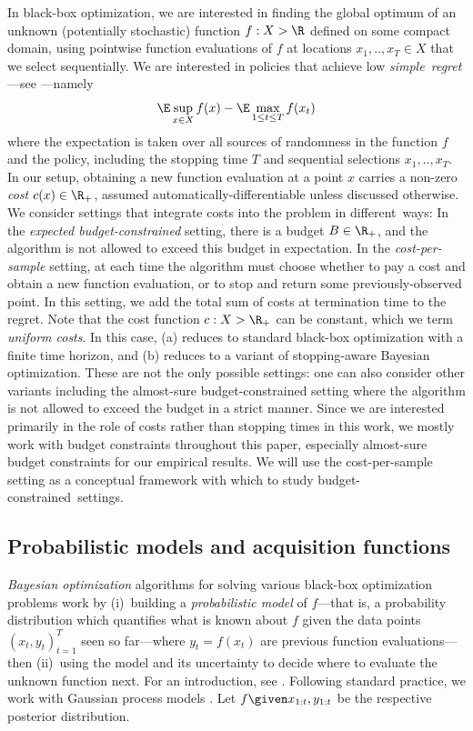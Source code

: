 \documentclass{article}
\begin{document}
In black-box optimization, we are interested in finding the global optimum of an unknown (potentially stochastic) function $f : X \-> \R$ defined on some compact domain, using pointwise function evaluations of $f$ at locations $x_1, .., x_T \in X$ that we select sequentially.
We are interested in policies that achieve low \emph{simple~regret}---see \textcite[Sec. 10.1]{garnett23}---namely
\[
\label{eqn:bb_opt_problem}
\E \sup_{x\in X} f(x) - \E \max_{1\leq t\leq T} f(x_t)
\]
where the expectation is taken over all sources of randomness in the function $f$ and the policy, including the stopping time $T$ and sequential selections $x_1, .., x_T$.
In our setup, obtaining a new function evaluation at a point $x$ carries a non-zero \emph{cost} $c(x) \in \R_+$, assumed automatically-differentiable unless discussed otherwise.
We consider settings that integrate costs into the problem in different~ways: 
\1[(a)] In the \emph{expected budget-constrained} setting, there is a budget $B \in \R_+$, and the algorithm is not allowed to exceed this budget in expectation.
\2 In the \emph{cost-per-sample} setting, at each time the algorithm must choose whether to pay a cost and obtain a new function evaluation, or to stop and return some previously-observed point. In this setting, we add the total sum of costs at termination time to the regret.
\0 
Note that the cost function $c : X \-> \R_+$ can be constant, which we term \emph{uniform costs}. 
In this case, (a) reduces to standard black-box optimization with a finite time horizon, and (b) reduces to a variant of stopping-aware Bayesian optimization.
These are not the only possible settings: one can also consider other variants including the almost-sure budget-constrained setting where the algorithm is not allowed to exceed the budget in a strict manner.
Since we are interested primarily in the role of costs rather than stopping times in this work, we mostly work with budget constraints throughout this paper, especially almost-sure budget constraints for our empirical results.
We will use the cost-per-sample setting as a conceptual framework with which to study budget-constrained~settings.


\subsection{Probabilistic models and acquisition functions}

\emph{Bayesian optimization} algorithms for solving various black-box optimization problems work by (i)~building a \emph{probabilistic model} of $f$---that is, a probability distribution which quantifies what is known about $f$ given the data points $(x_t, y_t)_{t=1}^T$ seen so far---where $y_t = f(x_t)$ are previous function evaluations---then (ii)~using the model and its uncertainty to decide where to evaluate the unknown function next.
For an introduction, see \textcite{frazier18,garnett23}.
Following standard practice, we work with Gaussian process models \cite{rasmussen06}. 
Let $f \given x_{1:t}, y_{1:t}$ be the respective posterior distribution.
\end{document}
